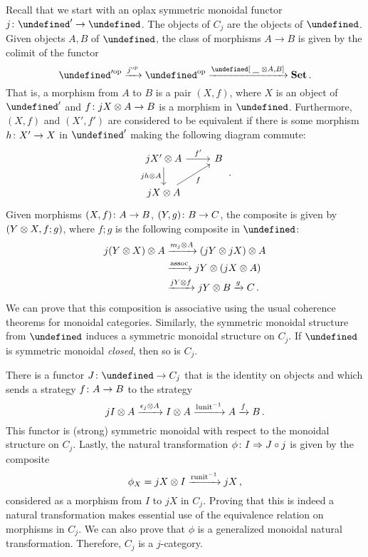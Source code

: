 \documentclass[sigplan,10pt,review]{acmart}\settopmatter{printfolios=true,printccs=false,printacmref=false}
\let\C\undefined
\begin{document}
Recall that we start with an oplax symmetric monoidal functor $j\from \C'\to\C$.  
The objects of $C_j$ are the objects of $\C$.  
Given objects $A,B$ of $\C$, the class of morphisms $A\to B$ is given by the colimit of the functor
\[
  \oppcat{\C'} \xrightarrow{\oppcat{j}}
  \oppcat{\C} \xrightarrow{\C[\blank\tensor A,B]}
  \Set\,.
  \]
That is, a morphism from $A$ to $B$ is a pair $(X,f)$, where $X$ is an object of $\C'$ and $f\colon jX \otimes A \to B$ is a morphism in $\C$.  
Furthermore, $(X, f)$ and $(X', f')$ are considered to be equivalent if there is some morphism $h\colon X'\to X$ in $\C'$ making the following diagram commute:
\[
  \begin{tikzcd}
    j X' \tensor A \arrow[r, "f'"] \arrow[d, "j h \tensor A"']
      & B \\
    j X \tensor A \arrow[ur, "f"']
      &
  \end{tikzcd}\,.
  \]
Given morphisms $(X,f)\colon A \to B$, $(Y,g)\colon B \to C$, the composite is given by $(Y\otimes X,f;g)$, where $f;g$ is the following composite in $\C$:
\begin{align*}
  j(Y\otimes X)\otimes A & \xrightarrow{m_j\otimes A}
    (jY \otimes jX) \otimes A \\ & \xrightarrow{\operatorname{assoc}}
      jY \otimes (jX \otimes A) \\ & \xrightarrow{jY \otimes f}
        jY \otimes B \xrightarrow{g}
          C\,.
\end{align*}
We can prove that this composition is associative using the usual coherence theorems for monoidal categories.  
Similarly, the symmetric monoidal structure from $\C$ induces a symmetric monoidal structure on $C_j$.  
If $\C$ is symmetric monoidal \emph{closed}, then so is $C_j$.

There is a functor $J\from \C\to C_j$ that is the identity on objects and which sends a strategy $f\colon A \to B$ to the strategy
\[
  j I \otimes A \xrightarrow{\epsilon_j\otimes A}
  I \otimes A \xrightarrow{\operatorname{lunit}^{-1}}
  A \xrightarrow{f} B\,.
  \]
This functor is (strong) symmetric monoidal with respect to the monoidal structure on $C_j$.  
Lastly, the natural transformation $\phi\colon I \Rightarrow J\circ j$ is given by the composite
\[
  \phi_X = jX \otimes I \xrightarrow{\operatorname{runit}^{-1}}
  jX\,,
  \]
considered as a morphism from $I$ to $jX$ in $C_j$.  
Proving that this is indeed a natural transformation makes essential use of the equivalence relation on morphisms in $C_j$.  
We can also prove that $\phi$ is a generalized monoidal natural transformation.  
Therefore, $C_j$ is a $j$-category.
\end{document}
